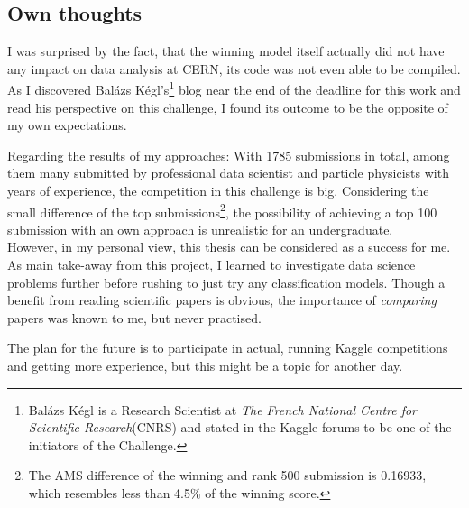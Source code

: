 \subsection{Own thoughts}
I was surprised by the fact, that the winning model itself actually did not have any impact on data analysis at CERN, its code was not even able to be compiled. As I discovered Balázs Kégl's\footnote{Balázs Kégl is a Research Scientist at \emph{The French National Centre for Scientific Research}(CNRS) and stated in the Kaggle forums to be one of the initiators of the Challenge.} blog near the end of the deadline for this work and read his perspective on this challenge, I found its outcome to be the opposite of my own  expectations.

Regarding the results of my approaches: With 1785 submissions in total, among them many submitted by professional data scientist and particle physicists with years of experience, the competition in this challenge is big. Considering the small difference of the top submissions\footnote{The AMS difference of the winning and rank 500 submission  is 0.16933, which resembles less than 4.5\% of the winning score.}, the possibility of achieving a top 100 submission with an own approach is unrealistic for an undergraduate.\\
However, in my personal view, this thesis can be considered as a success for me. As main take-away from this project, I learned to investigate data science problems further before rushing to just try any classification models. Though a benefit from reading scientific papers is obvious, the importance of \emph{comparing} papers was known to me, but never practised.

The plan for the future is to participate in actual, running Kaggle competitions and getting more experience, but this might be a topic for another day.
	{\pagebreak \thispagestyle{empty} \cleardoublepage}{\clearpage}